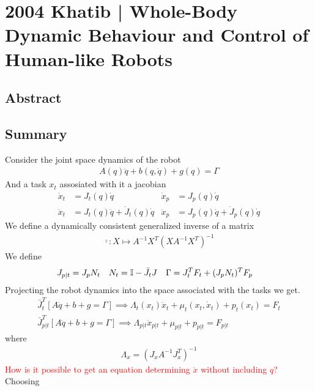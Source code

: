 \section{2004 Khatib | Whole-Body Dynamic Behaviour and Control of Human-like Robots}

\cite{khatib2004} 

\subsection{Abstract}

\subsection{Summary}

Consider the joint space dynamics of the robot
\begin{align}
    A(q)\ddot q + b(q, \dot q) + g(q) = \Gamma
\end{align}
And a task $x_t$ assosiated with it a jacobian
\begin{align}
    \dot x_t &= J_t(q)\dot q & \dot x_p &= J_p(q)\dot q\\
    \ddot x_t &= J_t(q) \ddot q + \dot{J}_t(q) \dot q & \ddot x_p &= J_p(q) \ddot q + \dot{J}_p(q) \dot q
\end{align}
We define a dynamically consistent generalized inverse \cite{khatib1987} of a matrix
\begin{align}
    \bar\cdot : X \mapsto A^{-1}X^T\left(X A^{-1} X^T\right)^{-1}
\end{align}
We define
\begin{align}
    J_{p|t} &= J_p N_t & N_t &= \mathbb{I} - \bar{J}_t J & \Gamma &= J_t^T F_t + (J_p N_t)^T F_p
\end{align}
Projecting the robot dynamics into the space associated with the tasks we get.
\begin{align}
    \bar{J}_t^T\left[A \ddot q + b + g = \Gamma \right] \implies
    \Lambda_t(x_t) \ddot x_t + \mu_t(x_t, \dot x_t) + p_t(x_t) = F_t \\
    \bar{J}_{p|t}^T\left[A \ddot q + b + g = \Gamma \right] \implies
    \Lambda_{p|t} \ddot x_{p|t} + \mu_{p|t} + p_{p|t} = F_{p|t}
\end{align}
where
\begin{align}
    \Lambda_x = \left(J_x A^{-1} J_x^T\right)^{-1}
\end{align}
\textcolor{red}{How is it possible to get an equation determining $\ddot x$
without including $q$?}
Choosing
